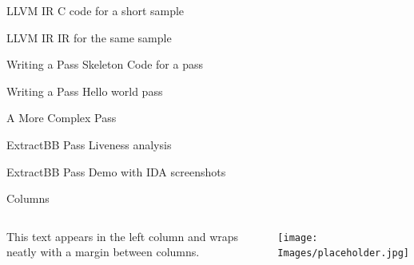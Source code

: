 \documentclass{beamer}
\newcommand{\todo}[1]{\color{red}{TODO: #1}}
\begin{document}
\begin{frame}{LLVM IR}
    C code for a short sample
\end{frame}

\begin{frame}{LLVM IR}
    IR for the same sample
\end{frame}


\begin{frame}{Writing a Pass}
    Skeleton Code for a pass
    \todo{Module/function/bb pass?}
\end{frame}

\begin{frame}{Writing a Pass}
    Hello world pass
\end{frame}


\begin{frame}{A More Complex Pass}
    \todo{Bogus arguments? Constant obfuscation? Detect vuln strcpy? Taint tracing?}
\end{frame}


\begin{frame}{ExtractBB Pass}
    Liveness analysis
\end{frame}

\begin{frame}{ExtractBB Pass}
    Demo with IDA screenshots
\end{frame}


\begin{frame}{Columns}
    \begin{columns}
            This text appears in the left column and wraps neatly with a margin between columns.

            \texttt{[image: Images/placeholder.jpg]}
    \end{columns}
\end{frame}

\end{document}
